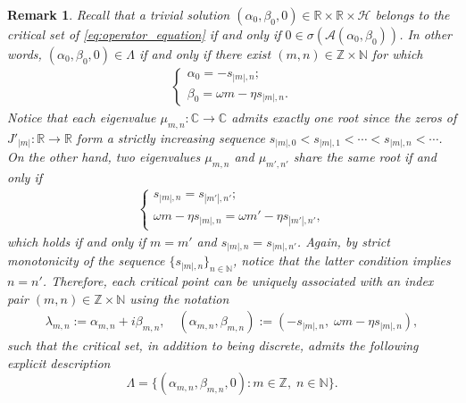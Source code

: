 \documentclass[11pt]{amsart}
\def\bc{{\mathbb{C}}}
\def\bn{{\mathbb{N}}}
\def\br{{\mathbb{R}}}
\def\bz{{\mathbb{Z}}}
\def\br{\mathbb R}
\newtheorem{remark}{Remark}[section]
\begin{document}
\begin{remark} \label{rm:critical_values} \rm
Recall that a trivial solution $(\alpha_0,\beta_0,0) \in \br \times \br \times \mathscr H$ belongs to the critical set of \eqref{eq:operator_equation} if and only if $0 \in \sigma(\mathscr A(\alpha_0,\beta_0))$. In other words, $(\alpha_0,\beta_0,0) \in \Lambda$ if and only if 
there exist $(m,n) \in \bz \times \bn$
for which 
\begin{align*}
\begin{cases}
\alpha_0 = -s_{|m|,n}; \\
\beta_0 = \omega m  -\eta s_{|m|,n}.
\end{cases}
\end{align*}
Notice that each eigenvalue $\mu_{m,n}: \bc \rightarrow \bc$ admits exactly one root since the zeros of $J'_{|m|}: \br \rightarrow \br$ form a strictly increasing sequence $s_{|m|,0} < s_{|m|,1} < \cdots < s_{|m|,n} < \cdots$. On the other hand, two eigenvalues $\mu_{m,n}$ and $\mu_{m',n'}$ share the same root if and only if
\begin{align*}
 \begin{cases}
s_{|m|,n} = s_{|m'|,n'}; \\
\omega m  - \eta s_{|m|,n} = \omega m'  - \eta s_{|m'|,n'},
\end{cases}   
\end{align*}
which holds if and only if $m = m'$ and $s_{|m|,n} = s_{|m|,n'}$. Again, by strict monotonicity of the sequence  $\{s_{|m|,n}\}_{n \in \mathbb N }$, notice that the latter condition implies $n = n'$. Therefore, each critical point can be uniquely associated with an index pair $(m,n) \in \bz \times \bn$ using the notation 
\begin{align}\label{def:critical_point_identification}
\lambda_{m,n} := \alpha_{m,n} + i \beta_{m,n}, \quad  (\alpha_{m,n}, \beta_{m,n}) :=  \left(-s_{|m|,n}, \; \omega m  - \eta s_{|m|,n} \right),
\end{align}
such that the critical set, in addition to being discrete, admits the following explicit description
\[
\Lambda = \{ (\alpha_{m,n},\beta_{m,n},0) : m \in \bz, \;  n \in  \bn  \}.
\]
\end{remark}
\end{document}
